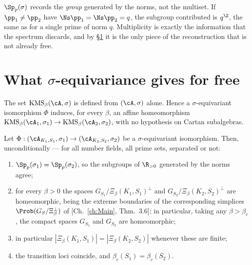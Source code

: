 \begin{remark}\label{XV:rem:missing}
$\Sp_p(\sigma)$ records the \emph{group} generated by the norms, not the multiset. If
$\pp_1\ne\pp_2$ have $\Ns\pp_1=\Ns\pp_2=q$, the subgroup contributed is $q^\Z$, the same as
for a single prime of norm $q$. Multiplicity is exactly the information that the spectrum
discards, and by \S\ref{XV:sec:free} it is the only piece of the reconstruction that is not
already free.
\end{remark}

\section{What $\sigma$-equivariance gives for free}\label{XV:sec:free}

\begin{proposition}\label{XV:prop:kmsintrinsic}
The set $\mathrm{KMS}_\beta(\cA,\sigma)$ is defined from $(\cA,\sigma)$ alone. Hence a
$\sigma$-equivariant isomorphism $\Phi$ induces, for every $\beta$, an affine homeomorphism
$\mathrm{KMS}_\beta(\cA_1,\sigma_1)\to\mathrm{KMS}_\beta(\cA_2,\sigma_2)$, with no hypothesis
on Cartan subalgebras.
\end{proposition}

\begin{theorem}\label{XV:thm:free}
Let $\Phi:(\cA_{K_1,S_1},\sigma_1)\to(\cA_{K_2,S_2},\sigma_2)$ be a $\sigma$-equivariant
isomorphism. Then, unconditionally --- for all number fields, all prime sets, separated or
not:
\begin{enumerate}
\item $\Sp_p(\sigma_1)=\Sp_p(\sigma_2)$, so the subgroups of $\R_{>0}$ generated by the norms
agree;
\item for every $\beta>0$ the spaces $G_{S_1}/\Xi_\beta(K_1,S_1)^\perp$ and
$G_{S_2}/\Xi_\beta(K_2,S_2)^\perp$ are homeomorphic, being the extreme boundaries of the
corresponding simplices $\Prob(G_S/\Xi_\beta^\perp)$ of [Ch.~\ref{ch:Main}, Thm.~3.6]; in particular,
taking any $\beta>\beta_c$, the compact spaces $G_{S_1}$ and $G_{S_2}$ are homeomorphic;
\item in particular $|\Xi_\beta(K_1,S_1)|=|\Xi_\beta(K_2,S_2)|$ whenever these are finite;
\item the transition loci coincide, and $\beta_c(S_1)=\beta_c(S_2)$.
\end{enumerate}
\end{theorem}

